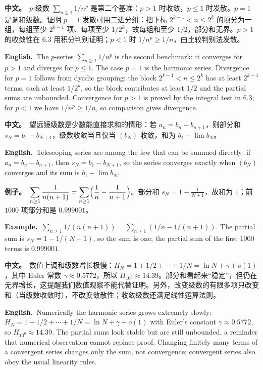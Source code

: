\documentclass[UTF8,11pt,a4paper]{ctexart}
\newcommand{\BOTH}[2]{\par\noindent\textbf{中文。}\ #1\par\noindent\textbf{English.}\ #2\par}
\newcommand{\EX}[2]{\par\noindent\textbf{例子。}\ #1\par\noindent\textbf{Example.}\ #2\par}
\begin{document}
\BOTH{$p$-级数 $\sum_{n\ge1}1/n^p$ 是第二个基准：$p>1$ 时收敛，$p\le1$ 时发散。$p=1$ 是调和级数。证明 $p=1$ 发散可用二进分组：把下标 $2^{k-1}<n\le2^k$ 的项分为一组，每组至少 $2^{k-1}$ 项、每项至少 $1/2^k$，故每组和至少 $1/2$，部分和无界。$p>1$ 的收敛性在 6.3 用积分判别证明；$p<1$ 时 $1/n^p\ge1/n$，由比较判别法发散。}{The $p$-series $\sum_{n\ge1}1/n^p$ is the second benchmark: it converges for $p>1$ and diverges for $p\le1$. The case $p=1$ is the harmonic series. Divergence for $p=1$ follows from dyadic grouping: the block $2^{k-1}<n\le2^k$ has at least $2^{k-1}$ terms, each at least $1/2^k$, so the block contributes at least $1/2$ and the partial sums are unbounded. Convergence for $p>1$ is proved by the integral test in 6.3; for $p<1$ we have $1/n^p\ge1/n$, so comparison gives divergence.}
\BOTH{望远镜级数是少数能直接求和的情形：若 $a_n=b_n-b_{n+1}$，则部分和 $s_N=b_1-b_{N+1}$，级数收敛当且仅当 $(b_N)$ 收敛，和为 $b_1-\lim b_N$。}{Telescoping series are among the few that can be summed directly: if $a_n=b_n-b_{n+1}$, then $s_N=b_1-b_{N+1}$, so the series converges exactly when $(b_N)$ converges and its sum is $b_1-\lim b_N$.}
\EX{$\displaystyle\sum_{n\ge1}\frac1{n(n+1)}=\sum_{n\ge1}\Bigl(\frac1n-\frac1{n+1}\Bigr)$。部分和 $s_N=1-\frac1{N+1}$，故和为 $1$；前 $1000$ 项部分和是 $0.999001$。}{$\sum_{n\ge1}1/(n(n+1))=\sum_{n\ge1}(1/n-1/(n+1))$. The partial sum is $s_N=1-1/(N+1)$, so the sum is one; the partial sum of the first $1000$ terms is $0.999001$.}
\BOTH{数值上调和级数增长极慢：$H_N=1+1/2+\cdots+1/N=\ln N+\gamma+o(1)$，其中 Euler 常数 $\gamma\approx0.5772$，所以 $H_{10^6}\approx14.39$。部分和看起来“稳定”，但仍在无界增长，这提醒我们数值观察不能代替证明。另外，改变级数的有限多项只改变和（当级数收敛时），不改变敛散性；收敛级数还满足线性运算法则。}{Numerically the harmonic series grows extremely slowly: $H_N=1+1/2+\cdots+1/N=\ln N+\gamma+o(1)$ with Euler's constant $\gamma\approx0.5772$, so $H_{10^6}\approx14.39$. The partial sums look stable but are still unbounded, a reminder that numerical observation cannot replace proof. Changing finitely many terms of a convergent series changes only the sum, not convergence; convergent series also obey the usual linearity rules.}
\end{document}
